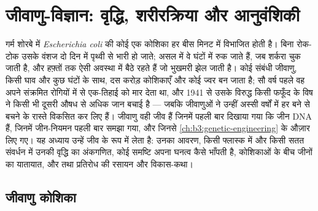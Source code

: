 \chapter{जीवाणु-विज्ञान: वृद्धि, शरीरक्रिया और आनुवंशिकी}\label{ch:b3:bacteriology}

गर्म शोरबे में \emph{Escherichia coli} की कोई एक कोशिका हर बीस मिनट में
विभाजित होती है। बिना रोक-टोक उसके वंशज दो दिन में पृथ्वी से भारी हो
जाते; असल में वे घंटों में रुक जाते हैं, जब शर्करा चुक जाती है, और
हफ़्तों तक ऐसी अवस्था में बैठे रहते हैं जो भुखमरी झेल जाती है। कोई
संबंधी जीवाणु, किसी घाव और कुछ घंटों के साथ, दस करोड़ कोशिकाएँ और कोई
ज्वर बन जाता है; सौ वर्ष पहले वह अपने संक्रमित रोगियों में से
एक-तिहाई को मार देता था, और 1941 से उसके विरुद्ध किसी फफूँद के विष ने
किसी भी दूसरी औषध से अधिक जान बचाई है --- जबकि जीवाणुओं ने उन्हीं अस्सी
वर्षों में हर बने  से बचने के रास्ते विकसित कर लिए हैं।
जीवाणु वही जीव हैं जिनमें पहली बार दिखाया गया कि जीन DNA हैं, जिनमें
जीन-नियमन पहली बार समझा गया, और जिनसे
\cref{ch:b3:genetic-engineering} के औज़ार लिए गए। यह अध्याय उन्हें जीव
के रूप में लेता है: उनका आवरण, किसी फ्लास्क में और किसी सतत संवर्धन में
उनकी वृद्धि का अंकगणित, कोई समष्टि अपना घनत्व कैसे भाँपती है,
कोशिकाओं के बीच जीनों का यातायात, और  तथा प्रतिरोध की रसायन
और विकास-कथा।

\section{जीवाणु कोशिका}


